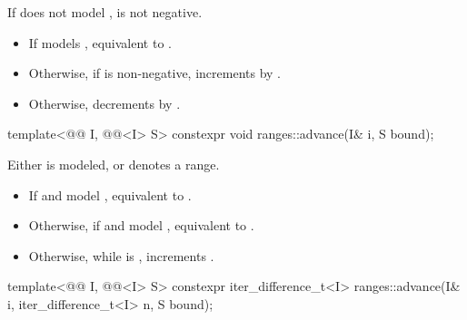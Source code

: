 \begin{itemdescr}
\pnum
\expects
If  does not model ,
 is not negative.

\pnum
\effects
\begin{itemize}
\item If  models ,
  equivalent to .
\item Otherwise, if  is non-negative, increments
   by .
\item Otherwise, decrements  by .
\end{itemize}
\end{itemdescr}

%
\begin{itemdecl}
template<@@ I, @@<I> S>
  constexpr void ranges::advance(I& i, S bound);
\end{itemdecl}

\begin{itemdescr}
\pnum
\expects
Either  is modeled, or
 denotes a range.

\pnum
\effects
\begin{itemize}
\item If  and  model ,
  equivalent to .
\item Otherwise, if  and  model ,
  equivalent to .
\item Otherwise, while  is ,
  increments .
\end{itemize}
\end{itemdescr}

%
\begin{itemdecl}
template<@@ I, @@<I> S>
  constexpr iter_difference_t<I> ranges::advance(I& i, iter_difference_t<I> n, S bound);
\end{itemdecl}

